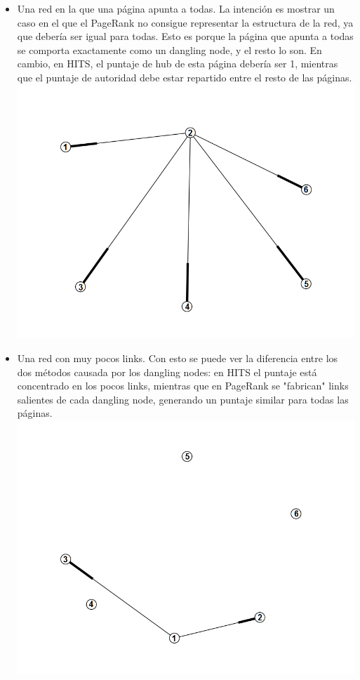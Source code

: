 \documentclass[a4paper]{article}
\begin{document}
\begin{itemize}
\item Una red en la que una página apunta a todas. La intención es mostrar un caso en el que el PageRank no consigue representar la estructura de la red, ya que debería ser igual para todas. Esto es porque la página que apunta a todas se comporta exactamente como un dangling node, y el resto lo son. En cambio, en HITS, el puntaje de hub de esta página debería ser 1, mientras que el puntaje de autoridad debe estar repartido entre el resto de las páginas. \\ 
\includegraphics[scale=0.5]{img/eldosatodosG.png}

\item Una red con muy pocos links. Con esto se puede ver la diferencia entre los dos métodos causada por los dangling nodes: en HITS el puntaje está concentrado en los pocos links, mientras que en PageRank se "fabrican" links salientes de cada dangling node, generando un puntaje similar para todas las páginas. \\
\includegraphics[scale=0.5]{img/pocoslinksG.png}


\end{itemize}
\end{document}
